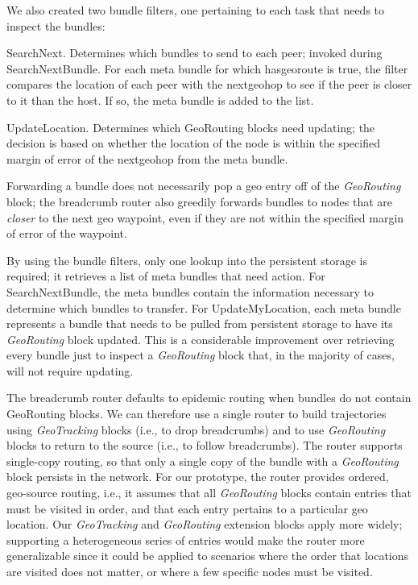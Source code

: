 We also created two {\sc bundle filters}, one pertaining to each task that needs to inspect the bundles:
\begin{description*}
\item[SearchNext.] Determines which bundles to send to each peer; invoked during {\sc SearchNextBundle}. For each {\sc meta bundle} for which {\sc hasgeoroute} is {\sc true}, the filter compares the location of each peer with the {\sc nextgeohop} to see if the peer is closer to it than the host. If so, the meta bundle is added to the list.
\item[UpdateLocation.] Determines which {\sc GeoRouting} blocks need updating; the decision is based on whether the location of the node is within the specified margin of error of the {\sc nextgeohop} from the meta bundle.
\end{description*}
Forwarding a bundle does not necessarily pop a geo entry off of the {\em GeoRouting} block; the {\sc breadcrumb} router also greedily forwards bundles to nodes that are {\em closer} to the next geo waypoint, even if they are not within the specified margin of error of the waypoint.

By using the {\sc bundle filters}, only one lookup into the persistent storage is required; it retrieves a list of {\sc meta bundles} that need action. For {\sc SearchNextBundle}, the {\sc meta bundles} contain the information necessary to determine which bundles to transfer. For {\sc UpdateMyLocation}, each {\sc meta bundle} represents a bundle that needs to be pulled from persistent storage to have its {\em GeoRouting} block updated. 
This is a considerable improvement over retrieving every bundle just to inspect a {\em GeoRouting} block that, in the majority of cases, will not require updating.

The {\sc breadcrumb} router defaults to epidemic routing when bundles do not contain {\sc GeoRouting} blocks. We can therefore use a single router to build trajectories using {\em GeoTracking} blocks (i.e., to drop breadcrumbs) and to use {\em GeoRouting} blocks to return to the source (i.e., to follow breadcrumbs). The router supports single-copy routing, so that only a single copy of the bundle with a {\em GeoRouting} block persists in the network. For our prototype, the router provides ordered, geo-source routing, i.e., it assumes that all {\em GeoRouting} blocks contain entries that must be visited in order, and that each entry pertains to a particular geo location. Our {\em GeoTracking} and {\em GeoRouting} extension blocks apply more widely; supporting a heterogeneous series of entries would make the router more generalizable since it could be applied to scenarios where the order that locations are visited does not matter, or where a few specific nodes must be visited.

